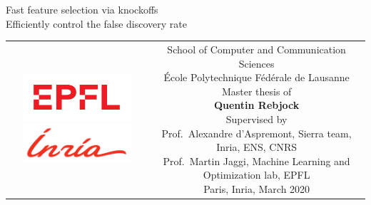 \begin{titlepage}
\begin{center}
\sffamily


\null\vspace{2cm}
{\huge Fast feature selection via knockoffs\\[12pt] Efficiently control the false discovery rate} \\[24pt]

\vfill

\begin{tabular} {cc}
\parbox{0.3\textwidth}{
	\includegraphics[width=4cm]{figures/epfl}
	\includegraphics[width=4cm]{figures/inria_cmjn.pdf}
}
&
\parbox{0.7\textwidth}{%
	School of Computer and Communication Sciences\\
	École Polytechnique Fédérale de Lausanne\\
	Master thesis of\\[4pt]
	\null \hspace{3em} \textbf{Quentin Rebjock}\\[9pt]
%
\small
Supervised by\\[4pt]
%
    Prof.\ Alexandre d'Aspremont, Sierra team, Inria, ENS, CNRS\\
    Prof.\ Martin Jaggi, Machine Learning and Optimization lab, EPFL\\[12pt]
%
Paris, Inria, March 2020}
\end{tabular}
\end{center}
\vspace{2cm}
\end{titlepage}
